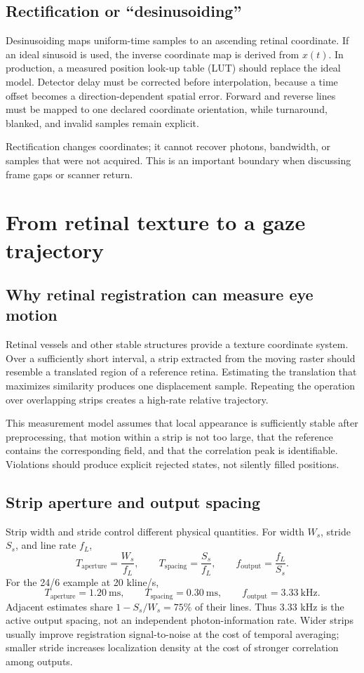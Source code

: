 \documentclass[11pt]{article}
\begin{document}
\subsection{Rectification or ``desinusoiding''}

Desinusoiding maps uniform-time samples to an ascending retinal coordinate. If an ideal sinusoid is
used, the inverse coordinate map is derived from $x(t)$. In production, a measured position
look-up table (LUT) should replace the ideal model. Detector delay must be corrected before
interpolation, because a time offset becomes a direction-dependent spatial error. Forward and
reverse lines must be mapped to one declared coordinate orientation, while turnaround, blanked, and
invalid samples remain explicit.

Rectification changes coordinates; it cannot recover photons, bandwidth, or samples that were not
acquired. This is an important boundary when discussing frame gaps or scanner return.

\section{From retinal texture to a gaze trajectory}

\subsection{Why retinal registration can measure eye motion}

Retinal vessels and other stable structures provide a texture coordinate system. Over a sufficiently
short interval, a strip extracted from the moving raster should resemble a translated region of a
reference retina. Estimating the translation that maximizes similarity produces one displacement
sample. Repeating the operation over overlapping strips creates a high-rate relative trajectory.

This measurement model assumes that local appearance is sufficiently stable after preprocessing,
that motion within a strip is not too large, that the reference contains the corresponding field,
and that the correlation peak is identifiable. Violations should produce explicit rejected states,
not silently filled positions.

\subsection{Strip aperture and output spacing}

Strip width and stride control different physical quantities. For width $W_s$, stride $S_s$, and
line rate $f_L$,
\[
  T_{\mathrm{aperture}}=\frac{W_s}{f_L},\qquad
  T_{\mathrm{spacing}}=\frac{S_s}{f_L},\qquad
  f_{\mathrm{output}}=\frac{f_L}{S_s}.
\]
For the 24/6 example at 20 kline/s,
\[
  T_{\mathrm{aperture}}=1.20~\mathrm{ms},\qquad
  T_{\mathrm{spacing}}=0.30~\mathrm{ms},\qquad
  f_{\mathrm{output}}=3.33~\mathrm{kHz}.
\]
Adjacent estimates share $1-S_s/W_s=75\%$ of their lines. Thus 3.33 kHz is the active output
spacing, not an independent photon-information rate. Wider strips usually improve registration
signal-to-noise at the cost of temporal averaging; smaller stride increases localization density at
the cost of stronger correlation among outputs.
\end{document}
